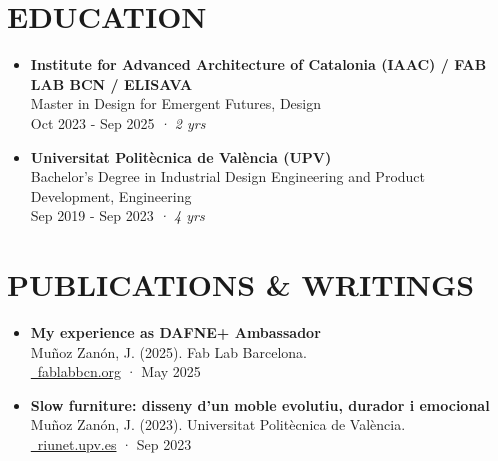 \documentclass[11pt,a4paper]{article}
\begin{document}
\section*{EDUCATION}
\begin{itemize}[leftmargin=*,label={},itemsep=6pt]
    \item \textbf{Institute for Advanced Architecture of Catalonia (IAAC) / FAB LAB BCN / ELISAVA}\\
    Master in Design for Emergent Futures, Design\\
    Oct 2023 - Sep 2025 \textit{· 2 yrs}
    
    \item \textbf{Universitat Politècnica de València (UPV)}\\
    Bachelor's Degree in Industrial Design Engineering and Product Development, Engineering\\
    Sep 2019 - Sep 2023 \textit{· 4 yrs}
\end{itemize}

\section*{PUBLICATIONS \& WRITINGS}
\begin{itemize}[leftmargin=*,label={},itemsep=6pt]
    \item \textbf{My experience as DAFNE+ Ambassador}\\
    Muñoz Zanón, J. (2025). Fab Lab Barcelona.\\
    \href{https://fablabbcn.org/blog/emergent-ideas/my-experience-as-dafne-ambassador}{\faLink\ fablabbcn.org} · May 2025
    
    \item \textbf{Slow furniture: disseny d'un moble evolutiu, durador i emocional}\\
    Muñoz Zanón, J. (2023). Universitat Politècnica de València.\\
    \href{https://riunet.upv.es/handle/10251/197203}{\faLink\ riunet.upv.es} · Sep 2023
\end{itemize}

\end{document}
